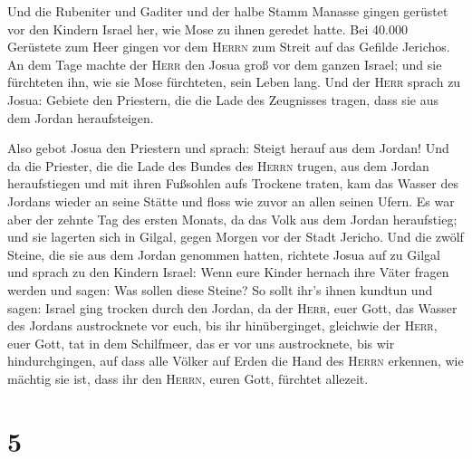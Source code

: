  Und die Rubeniter und Gaditer und der halbe Stamm
Manasse gingen gerüstet vor den Kindern Israel her, wie Mose zu ihnen
geredet hatte.  Bei 40.000 Gerüstete zum Heer gingen vor
dem \textsc{Herrn} zum Streit auf das Gefilde Jerichos. 
An dem Tage machte der \textsc{Herr} den Josua groß vor dem ganzen
Israel; und sie fürchteten ihn, wie sie Mose fürchteten, sein Leben
lang.  Und der \textsc{Herr} sprach zu Josua:
 Gebiete den Priestern, die die Lade des Zeugnisses
tragen, dass sie aus dem Jordan heraufsteigen.

 Also gebot Josua den Priestern und sprach: Steigt herauf
aus dem Jordan!  Und da die Priester, die die Lade des
Bundes des \textsc{Herrn} trugen, aus dem Jordan heraufstiegen und mit
ihren Fußsohlen aufs Trockene traten, kam das Wasser des Jordans wieder
an seine Stätte und floss wie zuvor an allen seinen Ufern.
 Es war aber der zehnte Tag des ersten Monats, da das
Volk aus dem Jordan heraufstieg; und sie lagerten sich in Gilgal, gegen
Morgen vor der Stadt Jericho.  Und die zwölf Steine, die
sie aus dem Jordan genommen hatten, richtete Josua auf zu Gilgal
 und sprach zu den Kindern Israel: Wenn eure Kinder
hernach ihre Väter fragen werden und sagen: Was sollen diese Steine?
 So sollt ihr's ihnen kundtun und sagen: Israel ging
trocken durch den Jordan,  da der \textsc{Herr}, euer
Gott, das Wasser des Jordans austrocknete vor euch, bis ihr
hinüberginget, gleichwie der \textsc{Herr}, euer Gott, tat in dem
Schilfmeer, das er vor uns austrocknete, bis wir hindurchgingen,
 auf dass alle Völker auf Erden die Hand des
\textsc{Herrn} erkennen, wie mächtig sie ist, dass ihr den
\textsc{Herrn}, euren Gott, fürchtet allezeit.

\hypertarget{section-4}{%
\section{5}\label{section-4}}

